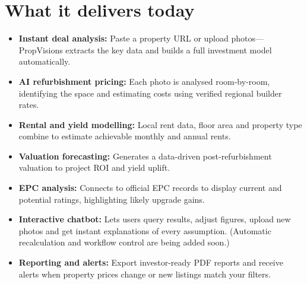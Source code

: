 \documentclass[11pt,a4paper]{article}
\newcommand{\product}{PropVisions}
\begin{document}
\section*{What it delivers today}
\begin{itemize}
  \item \textbf{Instant deal analysis:} Paste a property URL or upload photos—\product{} extracts the key data and builds a full investment model automatically.
  \item \textbf{AI refurbishment pricing:} Each photo is analysed room-by-room, identifying the space and estimating costs using verified regional builder rates.
  \item \textbf{Rental and yield modelling:} Local rent data, floor area and property type combine to estimate achievable monthly and annual rents.
  \item \textbf{Valuation forecasting:} Generates a data-driven post-refurbishment valuation to project ROI and yield uplift.
  \item \textbf{EPC analysis:} Connects to official EPC records to display current and potential ratings, highlighting likely upgrade gains.
  \item \textbf{Interactive chatbot:} Lets users query results, adjust figures, upload new photos and get instant explanations of every assumption.  
        (Automatic recalculation and workflow control are being added soon.)
  \item \textbf{Reporting and alerts:} Export investor-ready PDF reports and receive alerts when property prices change or new listings match your filters.
\end{itemize}
\end{document}
